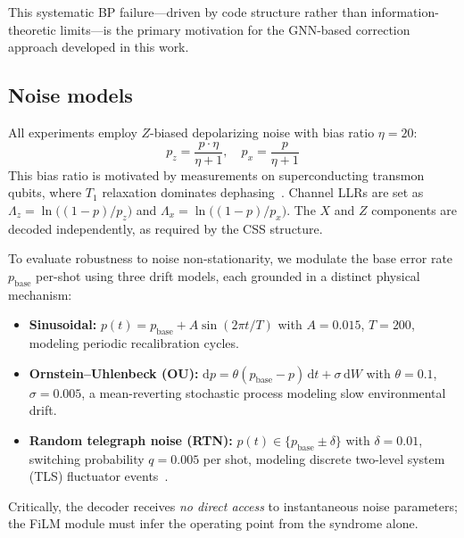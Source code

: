\documentclass[a4paper,twocolumn,11pt,unpublished,nopdfoutputerror]{quantumarticle}
\newcommand{\llr}{\Lambda}
\begin{document}
This systematic BP failure---driven by code structure rather than information-theoretic limits---is the primary motivation for the GNN-based correction approach developed in this work.

\subsection{Noise models}\label{sec:noise}

All experiments employ $Z$-biased depolarizing noise with bias ratio $\eta = 20$:
\begin{equation}
p_z = \frac{p \cdot \eta}{\eta + 1}, \quad p_x = \frac{p}{\eta + 1}
\label{eq:bias}
\end{equation}
This bias ratio is motivated by measurements on superconducting transmon qubits, where $T_1$ relaxation dominates dephasing~\cite{Tuckett2018Bias,Darmawan2021XZZX}. Channel LLRs are set as $\llr_z = \ln\bigl((1-p)/p_z\bigr)$ and $\llr_x = \ln\bigl((1-p)/p_x\bigr)$. The $X$ and $Z$ components are decoded independently, as required by the CSS structure.

To evaluate robustness to noise non-stationarity, we modulate the base error rate $p_\mathrm{base}$ per-shot using three drift models, each grounded in a distinct physical mechanism:

\begin{itemize}[leftmargin=*,topsep=2pt,itemsep=2pt]
\item \textbf{Sinusoidal:} $p(t) = p_\mathrm{base} + A\sin(2\pi t / T)$ with $A = 0.015$, $T = 200$, modeling periodic recalibration cycles.

\item \textbf{Ornstein--Uhlenbeck (OU):} $\mathrm{d}p = \theta(p_\mathrm{base} - p)\,\mathrm{d}t + \sigma\,\mathrm{d}W$ with $\theta = 0.1$, $\sigma = 0.005$, a mean-reverting stochastic process modeling slow environmental drift.

\item \textbf{Random telegraph noise (RTN):} $p(t) \in \{p_\mathrm{base} \pm \delta\}$ with $\delta = 0.01$, switching probability $q = 0.005$ per shot, modeling discrete two-level system (TLS) fluctuator events~\cite{Klimov2018,Burnett2019Decoherence}.
\end{itemize}

Critically, the decoder receives \emph{no direct access} to instantaneous noise parameters; the FiLM module must infer the operating point from the syndrome alone.


\end{document}
